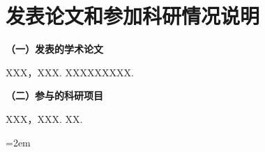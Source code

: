 
\chapter*{发表论文和参加科研情况说明}
\setlength{\parindent}{0em}
\textbf{（一）发表的学术论文}
\begin{publist}
\item XXX，XXX. XXXXXXXXX.
\end{publist}

\vspace*{1em}
\textbf{（二）参与的科研项目}
\begin{publist}
\item	XXX，XXX. XX.
\end{publist}
\vfill
{}\hangindent=2em\noindent

\setlength{\parindent}{2em}
